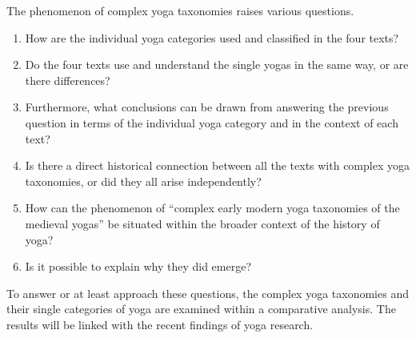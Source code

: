 The phenomenon of complex yoga taxonomies raises various questions.
\begin{enumerate}
\item How are the individual yoga categories used and classified in the four texts?
  \item Do the four texts use and understand the single yogas in the same way, or are there differences?
  \item Furthermore, what conclusions can be drawn from answering the previous question in terms of the individual yoga category and in the context of each text?
  \item Is there a direct historical connection between all the texts with complex yoga taxonomies, or did they all arise independently?
  \item How can the phenomenon of ``complex early modern yoga taxonomies of the medieval yogas'' be situated within the broader context of the history of yoga?
  \item Is it possible to explain why they did emerge? 
\end{enumerate}

To answer or at least approach these questions, the complex yoga taxonomies and their single categories of yoga are examined within a comparative analysis. The results will be linked with the recent findings of yoga research.

